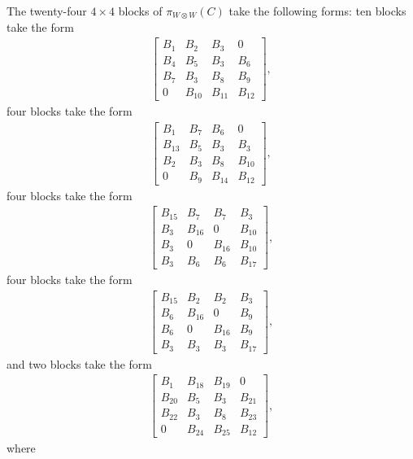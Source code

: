 \documentclass[pdftex]{sigma}
\numberwithin{equation}{section}
\theoremstyle{definition}
\begin{document}
The twenty-four $4 \times 4$ blocks of $\pi_{W \otimes W}(C)$ take the following forms: ten blocks take the form
\begin{align*}
 \begin{bmatrix}
B_1 & B_2 & B_3 & 0\\
B_4 & B_5 & B_3 & B_6\\
B_7 & B_3 & B_8 & B_9\\
0 & B_{10} & B_{11} & B_{12}
 \end{bmatrix},
\end{align*}
four blocks take the form
\begin{align*}
 \begin{bmatrix}
B_1 & B_7 & B_6 & 0\\
B_{13} & B_5 & B_3 & B_3\\
B_2 & B_3 & B_8 & B_{10}\\
0 & B_9 & B_{14} & B_{12}
 \end{bmatrix},
\end{align*}
four blocks take the form
\begin{align*}
 \begin{bmatrix}
B_{15} & B_7 & B_7 & B_3\\
B_3 & B_{16} & 0 & B_{10}\\
B_3 & 0 & B_{16} & B_{10}\\
B_3 & B_6 & B_6 & B_{17}
 \end{bmatrix},
\end{align*}
four blocks take the form
\begin{align*}
 \begin{bmatrix}
B_{15} & B_2 & B_2 & B_3\\
B_6 & B_{16} & 0 & B_9\\
B_6 & 0 & B_{16} & B_9\\
B_3 & B_3 & B_3 & B_{17}
 \end{bmatrix},
\end{align*}
and two blocks take the form
\begin{align*}
 \begin{bmatrix}
B_1 & B_{18} & B_{19} & 0\\
B_{20} & B_5 & B_3 & B_{21}\\
B_{22} & B_3 & B_8 & B_{23}\\
0 & B_{24} & B_{25} & B_{12}
 \end{bmatrix},
\end{align*}
where\vspace{-1mm}
\end{document}
